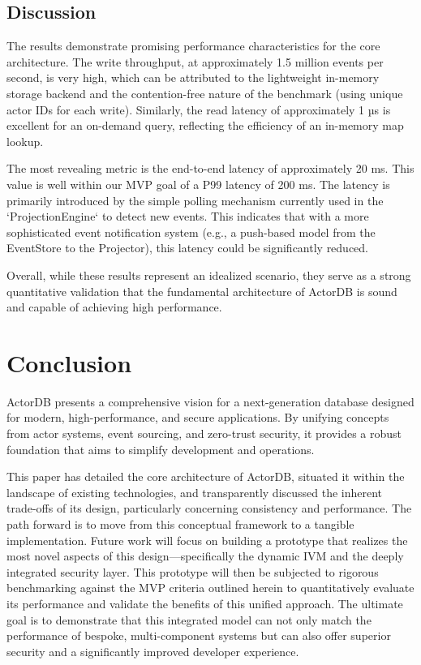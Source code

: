 \documentclass{article}
\begin{document}
\subsection{Discussion}
The results demonstrate promising performance characteristics for the core architecture. The write throughput, at approximately 1.5 million events per second, is very high, which can be attributed to the lightweight in-memory storage backend and the contention-free nature of the benchmark (using unique actor IDs for each write). Similarly, the read latency of approximately 1 µs is excellent for an on-demand query, reflecting the efficiency of an in-memory map lookup.

The most revealing metric is the end-to-end latency of approximately 20 ms. This value is well within our MVP goal of a P99 latency of 200 ms. The latency is primarily introduced by the simple polling mechanism currently used in the `ProjectionEngine` to detect new events. This indicates that with a more sophisticated event notification system (e.g., a push-based model from the EventStore to the Projector), this latency could be significantly reduced.

Overall, while these results represent an idealized scenario, they serve as a strong quantitative validation that the fundamental architecture of ActorDB is sound and capable of achieving high performance.

\section{Conclusion}
ActorDB presents a comprehensive vision for a next-generation database designed for modern, high-performance, and secure applications. By unifying concepts from actor systems, event sourcing, and zero-trust security, it provides a robust foundation that aims to simplify development and operations.

This paper has detailed the core architecture of ActorDB, situated it within the landscape of existing technologies, and transparently discussed the inherent trade-offs of its design, particularly concerning consistency and performance. The path forward is to move from this conceptual framework to a tangible implementation. Future work will focus on building a prototype that realizes the most novel aspects of this design—specifically the dynamic IVM and the deeply integrated security layer. This prototype will then be subjected to rigorous benchmarking against the MVP criteria outlined herein to quantitatively evaluate its performance and validate the benefits of this unified approach. The ultimate goal is to demonstrate that this integrated model can not only match the performance of bespoke, multi-component systems but can also offer superior security and a significantly improved developer experience.
\end{document}
